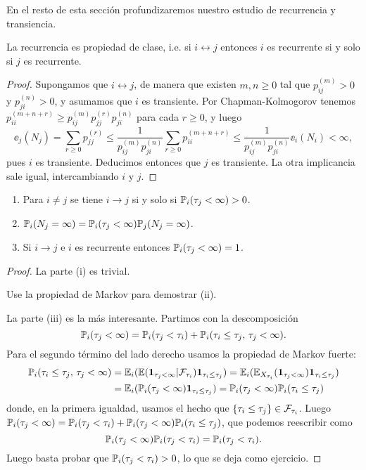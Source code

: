 En el resto de esta sección profundizaremos nuestro estudio de recurrencia y transiencia.

\begin{prop}
La recurrencia es propiedad de clase, i.e. si $i\leftrightarrow j$ entonces $i$ es recurrente si y solo si $j$ es recurrente.
\end{prop}

\begin{proof}
Supongamos que $i\leftrightarrow j$, de manera que existen $m,n\geq0$ tal que $p^{(m)}_{ij}>0$ y $p^{(n)}_{ji}>0$, y asumamos que $i$ es transiente.
Por Chapman-Kolmogorov tenemos $p^{(m+n+r)}_{ii}\geq p^{(m)}_{ij}p^{(r)}_{jj}p^{(n)}_{ji}$ para cada $r\geq0$, y luego
\[\ee_j(N_j)=\sum_{r\geq0}p^{(r)}_{jj}\leq\frac{1}{p^{(m)}_{ij}p^{(n)}_{ji}}\sum_{r\geq0}p^{(m+n+r)}_{ii}\leq\frac{1}{p^{(m)}_{ij}p^{(n)}_{ji}}\ee_i(N_i)<\infty,\]
pues $i$ es transiente.
Deducimos entonces que $j$ es transiente.
La otra implicancia sale igual, intercambiando $i$ y $j$.
\end{proof}

\begin{prop}
\leavevmode
\begin{enumerate}[label=\uptext{(\roman*)}]
\item Para $i\neq j$ se tiene $i\rightarrow j$ si y solo si $\mathbb{P}_i(\tau_j<\infty)>0$.
\item $\mathbb{P}_i(N_j=\infty)=\mathbb{P}_i(\tau_j<\infty)\mathbb{P}_j(N_j=\infty)$.
\item Si $i\rightarrow j$ e $i$ es recurrente entonces $\mathbb{P}_i(\tau_j<\infty)=1$.
\end{enumerate}
\end{prop}

\begin{proof}
La parte (i) es trivial.

\begin{exer}
Use la propiedad de Markov para demostrar (ii).
\end{exer}
\noindent La parte (iii) es la más interesante.
Partimos con la descomposición
\[\mathbb{P}_i(\tau_j<\infty)=\mathbb{P}_i(\tau_j<\tau_i)+\mathbb{P}_i(\tau_i\leq\tau_j,\,\tau_j<\infty).\]
Para el segundo término del lado derecho usamos la propiedad de Markov fuerte:
\begin{align}
\mathbb{P}_i(\tau_i\leq\tau_j,\,\tau_j<\infty)&=\mathbb{E}_i(\mathbb{E}(\mathbf{1}_{\tau_j<\infty}|\mathcal{F}_{\tau_i})\mathbf{1}_{\tau_i\leq\tau_j})=\mathbb{E}_i(\mathbb{E}_{X_{\tau_i}}(\mathbf{1}_{\tau_j<\infty})\mathbf{1}_{\tau_i\leq\tau_j})\\
&=\mathbb{E}_i(\mathbb{P}_i(\tau_j<\infty)\mathbf{1}_{\tau_i\leq\tau_j})=\mathbb{P}_i(\tau_j<\infty)\mathbb{P}_i(\tau_i\leq\tau_j)
\end{align}
donde, en la primera igualdad, usamos el hecho que $\{\tau_i\leq\tau_j\}\in\mathcal{F}_{\tau_i}$.
Luego $\mathbb{P}_i(\tau_j<\infty)=\mathbb{P}_i(\tau_j<\tau_i)+\mathbb{P}_i(\tau_j<\infty)\mathbb{P}_i(\tau_i\leq\tau_j)$, que podemos reescribir como
\[\mathbb{P}_i(\tau_j<\infty)\mathbb{P}_i(\tau_j<\tau_i)=\mathbb{P}_i(\tau_j<\tau_i).\]
Luego basta probar que $\mathbb{P}_i(\tau_j<\tau_i)>0$, lo que se deja como ejercicio.
\end{proof}

